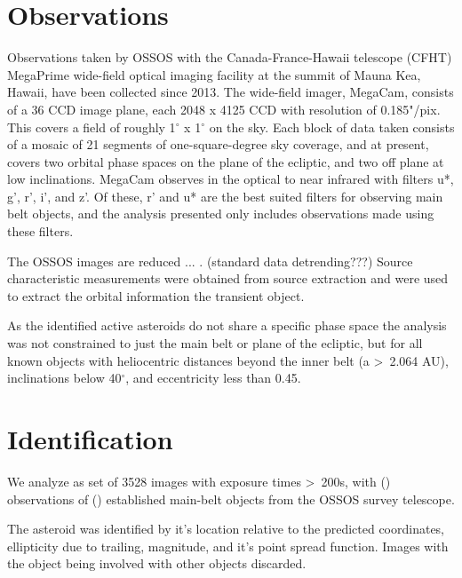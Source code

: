 \documentclass[iop,apj]{emulateapj}
\begin{document}

\section{Observations}

Observations taken by OSSOS with the Canada-France-Hawaii telescope (CFHT) MegaPrime wide-field optical imaging facility  at the summit of Mauna Kea, Hawaii, have been collected since 2013. The wide-field imager, MegaCam, consists of a 36 CCD image plane, each 2048 x 4125 CCD with resolution of 0.185"/pix. This covers a field of  roughly 1$^{\circ}$ x 1$^{\circ}$ on the sky. Each block of data taken consists of a mosaic of 21 segments of one-square-degree sky coverage, and at present, covers two orbital phase spaces on the plane of the ecliptic, and two off plane at low inclinations. MegaCam observes in the optical to near infrared with filters u*, g', r', i', and z'. Of these, r' and u* are the best suited filters for observing main belt objects, and the analysis presented only includes observations made using these filters. 

The OSSOS images are reduced ... . (standard data detrending???) Source characteristic measurements were obtained from source extraction  and were used to extract the orbital information the transient object. 


As the identified active asteroids do not share a specific phase space the analysis was not constrained to just the main belt or plane of the ecliptic, but for all known objects with heliocentric distances beyond the inner belt (a \textgreater \, 2.064 AU), inclinations below 40$^{\circ}$, and eccentricity less than 0.45. 

\section{Identification}

We analyze as set of 3528 images with exposure times \textgreater \, 200s, with () observations of () established main-belt objects from the OSSOS survey telescope. 

The asteroid was identified by it's location relative to the predicted coordinates,  ellipticity due to trailing,  magnitude, and it's point spread function. Images with the object being involved with other objects discarded. 
\end{document}
